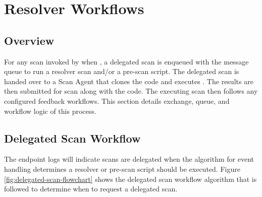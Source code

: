 \chapter{Resolver Workflows}\label{sec:resolver-workflows}

\section{Overview}
For any scan invoked by \cxoneflow\space when , 
a delegated scan is enqueued with the message queue to run a resolver scan and/or a pre-scan script.  The delegated scan is handed over
to a Scan Agent that clones the code and executes \scaresolver.  The \scaresolver results are
then submitted for scan along with the code.  The executing scan then follows any configured feedback workflows.
This section details exchange, queue, and workflow logic of this process.


\section{Delegated Scan Workflow}

The \cxoneflow endpoint logs will indicate scans are delegated when the algorithm for event handling
determines a resolver or pre-scan script should be executed.  Figure \ref{fig:delegated-scan-flowchart} shows the delegated scan
workflow algorithm that is followed to determine when to request a delegated scan.  


